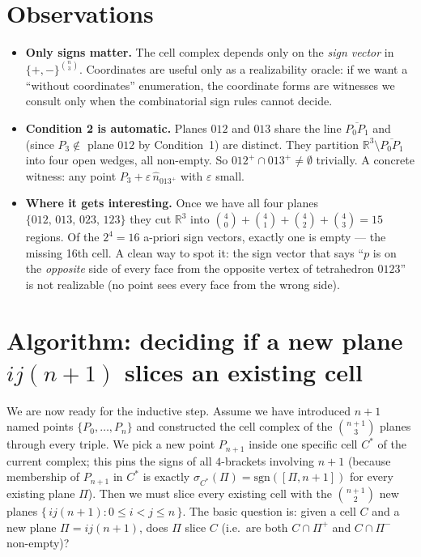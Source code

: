 \documentclass[11pt]{article}
\begin{document}
\section*{Observations}

\begin{itemize}
  \item \textbf{Only signs matter.} The cell complex depends only on the
  \emph{sign vector} in $\{+,-\}^{\binom{n}{3}}$. Coordinates are useful only as a
  realizability oracle: if we want a ``without coordinates'' enumeration, the
  coordinate forms are witnesses we consult only when the combinatorial sign rules
  cannot decide.

  \item \textbf{Condition 2 is automatic.} Planes $012$ and $013$ share the line
  $\overline{P_0P_1}$ and (since $P_3 \notin$ plane $012$ by Condition~1) are
  distinct. They partition $\mathbb{R}^3\setminus\overline{P_0P_1}$ into four open
  wedges, all non-empty. So $012^+\cap 013^+\neq\emptyset$ trivially. A concrete
  witness: any point $P_3 + \varepsilon\,\hat n_{013^+}$ with $\varepsilon$ small.

  \item \textbf{Where it gets interesting.} Once we have all four planes
  $\{012,\,013,\,023,\,123\}$ they cut $\mathbb{R}^3$ into
  $\binom{4}{0}+\binom{4}{1}+\binom{4}{2}+\binom{4}{3}=15$ regions. Of the $2^4=16$
  a-priori sign vectors, exactly one is empty --- the missing 16th cell. A clean
  way to spot it: the sign vector that says ``$p$ is on the \emph{opposite} side of
  every face from the opposite vertex of tetrahedron $0123$'' is not realizable
  (no point sees every face from the wrong side).
\end{itemize}

\section*{Algorithm: deciding if a new plane $ij(n{+}1)$ slices an existing cell}

We are now ready for the inductive step. Assume we have introduced $n+1$ named
points $\{P_0,\ldots,P_n\}$ and constructed the cell complex of the
$\binom{n+1}{3}$ planes through every triple. We pick a new point $P_{n+1}$
inside one specific cell $C^\ast$ of the current complex; this pins the signs of
all $4$-brackets involving $n{+}1$ (because membership of $P_{n+1}$ in $C^\ast$
is exactly $\sigma_{C^\ast}(\Pi) = \mathrm{sgn}([\Pi, n{+}1])$ for every existing
plane $\Pi$). Then we must slice every existing cell with the $\binom{n+1}{2}$
new planes $\bigl\{\,ij(n{+}1) : 0\le i<j\le n\,\bigr\}$. The basic question is:
given a cell $C$ and a new plane $\Pi = ij(n{+}1)$, does $\Pi$ slice $C$ (i.e.\
are both $C\cap\Pi^+$ and $C\cap\Pi^-$ non-empty)?
\end{document}
